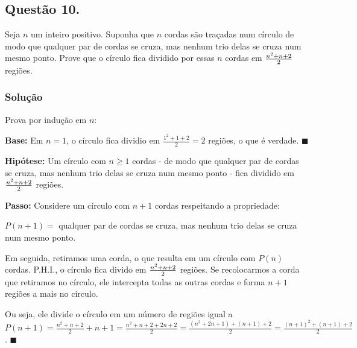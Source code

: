 \documentclass[12pt, letterpaper]{report}
\newcommand*{\CQD}{\hfill\ensuremath{\blacksquare}}%
\newcounter{ProblemNum}
\newcommand*{\anyproblem}[1]{\newpage\subsection*{#1}}
\newcommand*{\problem}[1]{\stepcounter{ProblemNum} %
   \anyproblem{Questão #1}}
\newcommand*{\soln}[1]{\subsubsection*{#1}}
\newcommand*{\solution}{\soln{Solução}}
\begin{document}
\problem{10.}
Seja $ n $ um inteiro positivo. Suponha que $ n $ cordas são traçadas num círculo de modo que qualquer par de cordas se cruza, mas nenhum trio delas se cruza num mesmo ponto. Prove que o círculo fica dividido por essas $ n $ cordas em $ {n^2 + n + 2} \over {2} $ regiões.

\solution
    Prova por indução em $n$:

    \textbf{Base:} Em $n = 1$, o círculo fica dividio em $\frac{1^2 + 1 + 2}{2} = 2$ regiões, o que é verdade. \CQD

    \textbf{Hipótese:} Um círculo com $n \geq 1$ cordas - de modo que qualquer par de cordas se cruza, mas nenhum trio delas se cruza num mesmo ponto - fica dividido em $ {n^2 + n + 2} \over {2} $ regiões.

    \textbf{Passo:} Considere um círculo com $n + 1$ cordas respeitando a propriedade:

    $P(n + 1) =$ qualquer par de cordas se cruza, mas nenhum trio delas se cruza num mesmo ponto. 

    Em seguida, retiramos uma corda, o que resulta em um círculo com $P(n)$ cordas. P.H.I., o círculo fica divido em $ {n^2 + n + 2} \over {2} $ regiões. Se recolocarmos a corda que retiramos no círculo, ele intercepta todas as outras cordas e forma $n + 1$ regiões a mais no círculo. 

    Ou seja, ele divide o círculo em um número de regiões igual a $P(n + 1) = \frac{n^2 + n + 2}{2} + n + 1 = \frac{n^2 + n + 2 + 2n + 2}{2} = \frac{(n^2 + 2n + 1) + (n + 1) + 2}{2} = \frac{(n + 1)^2 + (n + 1) + 2}{2} $. \CQD
\end{document}
